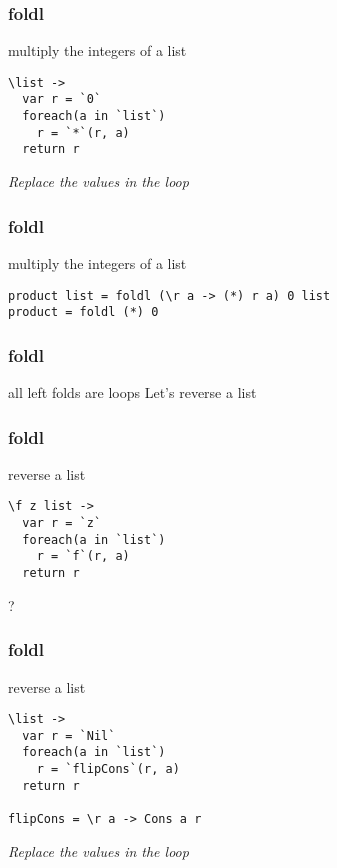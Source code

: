 \begin{frame}[fragile]
\frametitle{foldl}
\begin{block}{multiply the integers of a list}
\begin{lstlisting}[style=haskell,basicstyle=\scriptsize\ttfamily,mathescape]
\list ->
  var r = `0`
  foreach(a in `list`)
    r = `*`(r, a)
  return r
\end{lstlisting}
\end{block}
\begin{center}
\LARGE
\emph{Replace the values in the loop}
\end{center}
\end{frame}

\begin{frame}[fragile]
\frametitle{foldl}
\begin{block}{multiply the integers of a list}
\begin{lstlisting}[style=haskell,basicstyle=\scriptsize\ttfamily,mathescape]
product list = foldl (\r a -> (*) r a) 0 list
product = foldl (*) 0
\end{lstlisting}
\end{block}
\end{frame}

\begin{frame}[fragile]
\frametitle{foldl}
\begin{block}{all left folds are loops}
Let's reverse a list
\end{block}
\end{frame}

\begin{frame}[fragile]
\frametitle{foldl}
\begin{block}{reverse a list}
\begin{lstlisting}[style=haskell,basicstyle=\scriptsize\ttfamily,mathescape]
\f z list ->
  var r = `z`
  foreach(a in `list`)
    r = `f`(r, a)
  return r
\end{lstlisting}
\end{block}
\begin{center}
\LARGE
?
\end{center}
\end{frame}

\begin{frame}[fragile]
\frametitle{foldl}
\begin{block}{reverse a list}
\begin{lstlisting}[style=haskell,basicstyle=\scriptsize\ttfamily,mathescape]
\list ->
  var r = `Nil`
  foreach(a in `list`)
    r = `flipCons`(r, a)
  return r

flipCons = \r a -> Cons a r
\end{lstlisting}
\end{block}
\begin{center}
\LARGE
\emph{Replace the values in the loop}
\end{center}
\end{frame}

